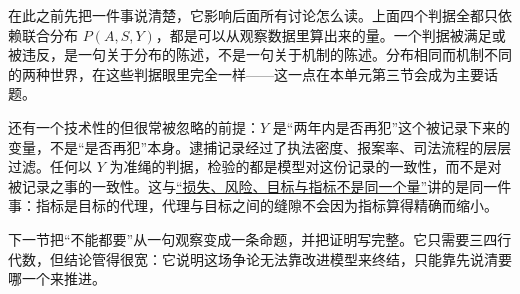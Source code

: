 在此之前先把一件事说清楚，它影响后面所有讨论怎么读。上面四个判据全都只依赖联合分布 \(P(A,S,Y)\)，都是可以从观察数据里算出来的量。一个判据被满足或被违反，是一句关于分布的陈述，不是一句关于机制的陈述。分布相同而机制不同的两种世界，在这些判据眼里完全一样——这一点在本单元第三节会成为主要话题。

还有一个技术性的但很常被忽略的前提：\(Y\) 是``两年内是否再犯''这个被记录下来的变量，不是``是否再犯''本身。逮捕记录经过了执法密度、报案率、司法流程的层层过滤。任何以 \(Y\) 为准绳的判据，检验的都是模型对这份记录的一致性，而不是对被记录之事的一致性。这与\hyperref[sec:13-Machine-Learning/01-Learning-Problems-and-Evaluation/02]{``损失、风险、目标与指标不是同一个量''}讲的是同一件事：指标是目标的代理，代理与目标之间的缝隙不会因为指标算得精确而缩小。

下一节把``不能都要''从一句观察变成一条命题，并把证明写完整。它只需要三四行代数，但结论管得很宽：它说明这场争论无法靠改进模型来终结，只能靠先说清要哪一个来推进。
